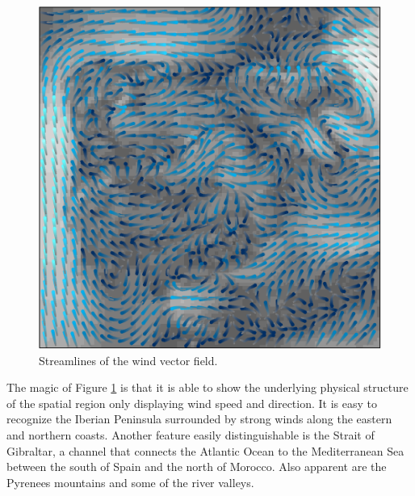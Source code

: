 \begin{figure}[htb]
\centering
\includegraphics[width=.9\linewidth]{figs/streamplot.pdf}
\caption{\label{fig:streamplot}Streamlines of the wind vector field.}
\end{figure}

The magic of Figure \ref{fig:streamplot} is that it is able to show the
underlying physical structure of the spatial region only displaying
wind speed and direction. It is easy to recognize the Iberian
Peninsula surrounded by strong winds along the eastern and northern
coasts. Another feature easily distinguishable is the Strait of
Gibraltar, a channel that connects the Atlantic Ocean to the
Mediterranean Sea between the south of Spain and the north of
Morocco. Also apparent are the Pyrenees mountains and some of the
river valleys.
